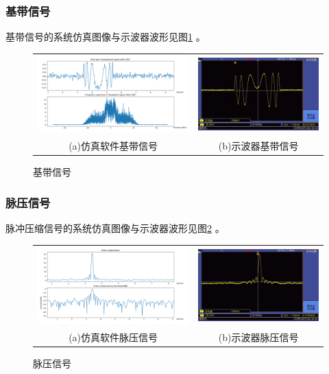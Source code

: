 \documentclass[12pt]{article}
\begin{document}
\subsubsection{基带信号}
基带信号的系统仿真图像与示波器波形见图\ref{jdxh}
。
\begin{figure}[htbp]
\centering
\begin{tabular}{cc}
\includegraphics[width=.55\textwidth]{TIM20190915233658}&\includegraphics[width=.45\textwidth]{002}\\
(a)仿真软件基带信号&(b)示波器基带信号\\
\end{tabular}
\caption{基带信号}\label{jdxh}
\end{figure}
\subsubsection{脉压信号}
脉冲压缩信号的系统仿真图像与示波器波形见图\ref{myxh}
。
\begin{figure}[htbp]
\centering
\begin{tabular}{cc}
\includegraphics[width=.55\textwidth]{TIM20190915233929}&\includegraphics[width=.45\textwidth]{003}\\
(a)仿真软件脉压信号&(b)示波器脉压信号\\
\end{tabular}
\caption{脉压信号}\label{myxh}
\end{figure}
\end{document}

